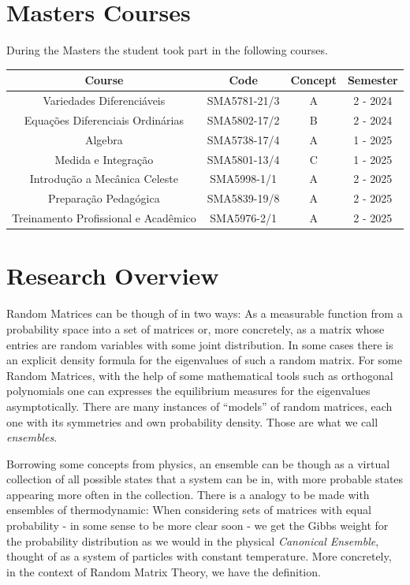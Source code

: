 \documentclass[12pt]{report}
\begin{document}
\section{Masters Courses}

During the Masters the student took part in the following courses.
\hspace{1cm}

\begin{center}
	\begin{tabular}{|c|c|c|c|}
		\hline
		\textbf{Course} & \textbf{Code} & \textbf{Concept} & \textbf{Semester} \\
		\hline
		Variedades Diferenciáveis & SMA5781-21/3 & A & 2 - 2024 \\
		\hline
	    Equações Diferenciais Ordinárias & SMA5802-17/2 & B & 2 - 2024 \\
		\hline
		Algebra& SMA5738-17/4 & A & 1 - 2025 \\
		\hline
		Medida e Integração & SMA5801-13/4 & C & 1 - 2025 \\
		\hline
		Introdução a Mecânica Celeste& SMA5998-1/1 & A & 2 - 2025 \\
		\hline
		Preparação Pedagógica& SMA5839-19/8 & A & 2 - 2025 \\
		\hline
	    Treinamento Profissional e Acadêmico & SMA5976-2/1 & A & 2 - 2025 \\
		\hline
	\end{tabular}
\end{center}

\section{Research Overview}
\label{Pesquisa}

Random Matrices can be though of in two ways: As a measurable function from a probability space into a set of matrices or, more concretely, as a matrix whose entries are random variables with some joint distribution. In some cases there is an explicit density formula for the eigenvalues of such a random matrix. For some Random Matrices, with the help of some mathematical tools such as orthogonal polynomials one can expresses the equilibrium measures for the eigenvalues asymptotically.  There are many instances of \enquote{models} of random matrices, each one with its symmetries and own probability density. Those are what we call \textit{ensembles}. 

Borrowing some concepts from physics, an ensemble can be though as a virtual collection of all possible states that a system can be in, with more probable states appearing more often in the collection. There is a analogy to be made with ensembles of thermodynamic: When considering sets of matrices with equal probability - in some sense to be more clear soon - we get the Gibbs weight for the probability distribution as we would in the physical \textit{Canonical Ensemble}, thought of as a system of particles with constant temperature. More concretely, in the context of Random Matrix Theory, we have the definition.
\end{document}
